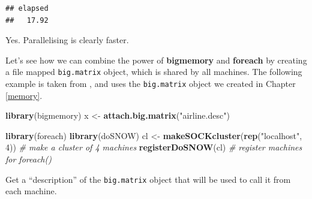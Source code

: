 \documentclass[]{book}
\newenvironment{Shaded}{\begin{snugshade}}{\end{snugshade}}
\newcommand{\KeywordTok}[1]{\textcolor[rgb]{0.13,0.29,0.53}{\textbf{#1}}}
\newcommand{\DataTypeTok}[1]{\textcolor[rgb]{0.13,0.29,0.53}{#1}}
\newcommand{\DecValTok}[1]{\textcolor[rgb]{0.00,0.00,0.81}{#1}}
\newcommand{\StringTok}[1]{\textcolor[rgb]{0.31,0.60,0.02}{#1}}
\newcommand{\CommentTok}[1]{\textcolor[rgb]{0.56,0.35,0.01}{\textit{#1}}}
\newcommand{\OtherTok}[1]{\textcolor[rgb]{0.56,0.35,0.01}{#1}}
\newcommand{\OperatorTok}[1]{\textcolor[rgb]{0.81,0.36,0.00}{\textbf{#1}}}
\newcommand{\NormalTok}[1]{#1}
\theoremstyle{definition}
\theoremstyle{definition}
\theoremstyle{definition}
\theoremstyle{remark}
\begin{document}
\begin{Shaded}
\end{Shaded}

\begin{verbatim}
## elapsed 
##   17.92
\end{verbatim}

Yes. Parallelising is clearly faster.

Let's see how we can combine the power of \textbf{bigmemory} and
\textbf{foreach} by creating a file mapped \texttt{big.matrix} object,
which is shared by all machines. The following example is taken from
\citet{kane2013scalable}, and uses the \texttt{big.matrix} object we
created in Chapter \ref{memory}.

\begin{Shaded}
\begin{Highlighting}[]
\KeywordTok{library}\NormalTok{(bigmemory)}
\NormalTok{x <-}\StringTok{ }\KeywordTok{attach.big.matrix}\NormalTok{(}\StringTok{"airline.desc"}\NormalTok{)}

\KeywordTok{library}\NormalTok{(foreach)}
\KeywordTok{library}\NormalTok{(doSNOW)}
\NormalTok{cl <-}\StringTok{ }\KeywordTok{makeSOCKcluster}\NormalTok{(}\KeywordTok{rep}\NormalTok{(}\StringTok{"localhost"}\NormalTok{, }\DecValTok{4}\NormalTok{)) }\CommentTok{# make a cluster of 4 machines}
\KeywordTok{registerDoSNOW}\NormalTok{(cl) }\CommentTok{# register machines for foreach()}
\end{Highlighting}
\end{Shaded}

Get a ``description'' of the \texttt{big.matrix} object that will be
used to call it from each machine.
\end{document}
